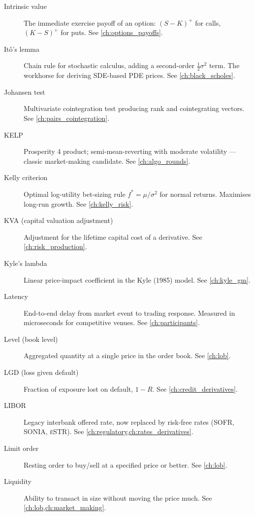 \begin{description}
\item[Intrinsic value]
The immediate exercise payoff of an option: $(S-K)^+$ for calls, $(K-S)^+$
for puts. See \cref{ch:options_payoffs}.

\item[It\^o's lemma]
Chain rule for stochastic calculus, adding a second-order $\tfrac12
\sigma^2$ term. The workhorse for deriving SDE-based PDE prices. See \cref{ch:black_scholes}.

\item[Johansen test]
Multivariate cointegration test producing rank and cointegrating
vectors. See \cref{ch:pairs_cointegration}.

\item[KELP]
Prosperity 4 product; semi-mean-reverting with moderate volatility ---
classic market-making candidate. See \cref{ch:algo_rounds}.

\item[Kelly criterion]
Optimal log-utility bet-sizing rule $f^* = \mu/\sigma^2$ for normal
returns. Maximises long-run growth. See \cref{ch:kelly_risk}.

\item[KVA (capital valuation adjustment)]
Adjustment for the lifetime capital cost of a derivative. See \cref{ch:risk_production}.

\item[Kyle's lambda]
Linear price-impact coefficient in the Kyle (1985) model. See \cref{ch:kyle_gm}.

\item[Latency]
End-to-end delay from market event to trading response. Measured in
microseconds for competitive venues. See \cref{ch:participants}.

\item[Level (book level)]
Aggregated quantity at a single price in the order book. See \cref{ch:lob}.

\item[LGD (loss given default)]
Fraction of exposure lost on default, $1-R$. See \cref{ch:credit_derivatives}.

\item[LIBOR]
Legacy interbank offered rate, now replaced by risk-free rates (SOFR,
SONIA, \textsc{\'e}STR). See \cref{ch:regulatory,ch:rates_derivatives}.

\item[Limit order]
Resting order to buy/sell at a specified price or better. See \cref{ch:lob}.

\item[Liquidity]
Ability to transact in size without moving the price much. See \cref{ch:lob,ch:market_making}.


\end{description}

